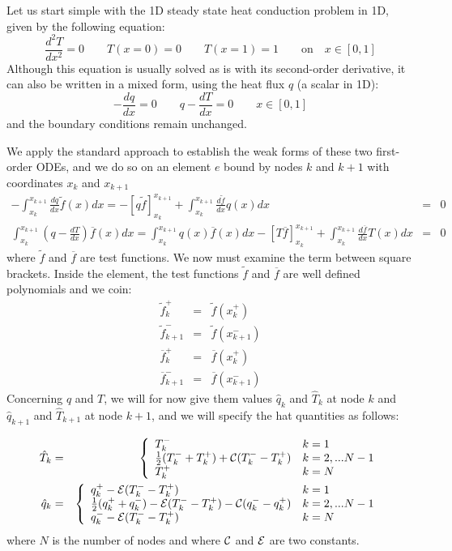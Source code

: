 
Let us start simple with the 1D steady state heat conduction problem in 1D, given by the following 
equation:
\begin{equation}
\frac{d^2T}{dx^2}=0 \qquad T(x=0)=0 \qquad T(x=1)=1 \qquad \text{on} \quad x\in[0,1]
\end{equation}
Although this equation is usually solved as is with its second-order derivative, it can also 
be written in a mixed form, using the heat flux $q$ (a scalar in 1D):
\[
-\frac{dq}{dx}=0 \qquad q-\frac{dT}{dx}=0 \qquad x\in[0,1]
\]
and the boundary conditions remain unchanged. 

We apply the standard approach to establish the weak forms of these two first-order ODEs, and we do so 
on an element $e$ bound by nodes $k$ and $k+1$ with coordinates $x_k$ and $x_{k+1}$
\begin{eqnarray}
-\int_{x_k}^{x_{k+1}} \frac{dq}{dx} \tilde{f}(x) dx = -\left[q \tilde{f} \right]_{x_k}^{x_{k+1}} 
+ \int_{x_k}^{x_{k+1}} \frac{d\tilde{f}}{dx} q(x) dx &=& 0
\label{eq:dg1}\\
\int_{x_k}^{x_{k+1}}  \left( q-\frac{dT}{dx} \right) \overline{f}(x) dx
=
\int_{x_k}^{x_{k+1}}  q(x) \overline{f}(x) dx
-\left[ T \overline{f}  \right]_{x_k}^{x_{k+1}} + \int_{x_k}^{x_{k+1}} \frac{d\overline{f}}{dx} T(x) dx 
&=& 0
\label{eq:dg2}
\end{eqnarray}
where $\tilde{f}$ and $\overline{f}$ are test functions.
We now must examine the term between square brackets. 
Inside the element, the test functions $\tilde{f}$ and $\overline{f}$ are well defined polynomials
and we coin:
\begin{eqnarray}
\tilde{f}_k^+&=&\tilde{f}(x_k^+)\\
\tilde{f}_{k+1}^-&=&\tilde{f}(x_{k+1}^-)\\
\overline{f}_k^+&=&\overline{f}(x_k^+)\\
\overline{f}_{k+1}^-&=&\overline{f}(x_{k+1}^-)
\end{eqnarray}
Concerning $q$ and $T$, we will for now  give them values $\hat{q}_k$ and $\hat{T}_k$ at node $k$
and $\hat{q}_{k+1}$ and $\hat{T}_{k+1}$ at node $k+1$, and we will specify the hat quantities as follows:

\begin{eqnarray}
\hat{T}_k &=&
\left\{
\begin{array}{ll}
T_k^-   & k=1 \\ 
\frac{1}{2}(T_k^-+T_k^+) + {\cal C} (T_k^- - T_k^+) & k=2,...N-1\\
T_k^+    & k=N \\ 
\end{array}
\right. \nonumber\\
\hat{q}_k &=&
\left\{
\begin{array}{ll}
q_k^+ -{\cal E} (T_k^--T_k^+)  & k=1 \\ 
\frac{1}{2}(q_k^+ + q_k^-) - {\cal E} (T_k^- - T_k^+) - {\cal C}(q_k^- - q_k^+) & k=2,...N-1\\
q_k^- -{\cal E} (T_k^--T_k^+)    & k=N \\ 
\end{array}
\right.
\end{eqnarray}
where $N$ is the number of nodes and where ${\cal C}$ and ${\cal E}$ are two constants. 

